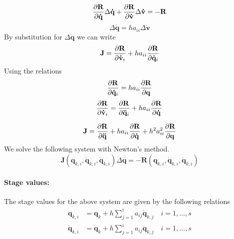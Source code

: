 \documentclass[pdftex,11pt,letter]{article}
\begin{document}
\begin{multicols}{2}
\begin{equation}
 \mathbf{\dfrac{\partial R}{\partial \dot{q}}} \Delta \mathbf{\dot{q}} +
 \mathbf{\dfrac{\partial R}{\partial \dot{v}}} \Delta \mathbf{\dot{v}} = -\mathbf{R}
\end{equation}
\begin{equation}
  \Delta \mathbf{\dot{q}} = h a_{ii} \Delta \mathbf{\dot{v}}
\end{equation}
By substitution for $\Delta \mathbf{\dot{q}} $ we can write
\begin{equation}
  \mathbf{J} = \dfrac{\partial \mathbf{R}}{\partial \mathbf{\dot{v}}_{i}} + h a_{ii}
  \dfrac{\partial \mathbf{R}}{\partial \mathbf{\dot{q}}_{i}}
\end{equation}
Using the relations
\begin{equation}
  \dfrac{\partial \mathbf{R}}{\partial \mathbf{\dot{q}}_{i}} = h a_{ii} \dfrac{\partial \mathbf{R}}{\partial \mathbf{{q}}}
\end{equation}
\begin{equation}
  \dfrac{\partial \mathbf{R}}{\partial \mathbf{\dot{v}}_{i}} =  \dfrac{\partial \mathbf{R}}{\partial \mathbf{\ddot{q}}_{i}} + h a_{ii} \dfrac{\partial \mathbf{R}}{\partial \mathbf{\dot{q}}} 
\end{equation}

\begin{equation}
  \mathbf{J} = \dfrac{\partial \mathbf{R}}{\partial \mathbf{\ddot{q}}} + h a_{ii}
  \dfrac{\partial \mathbf{R}}{\partial \mathbf{\dot{q}}} + h^2 a_{ii}^2
  \dfrac{\partial \mathbf{R}}{\partial \mathbf{{q}}}
\end{equation}
We solve the following system with Newton's method.
\begin{equation}
 \mathbf{J}
 \left(\mathbf{q}_{k,i},\mathbf{\dot{q}}_{k,i},\mathbf{\ddot{q}}_{k,i}\right)
 \Delta\mathbf{\ddot{q}} = -\mathbf{R}
 \left(\mathbf{q}_{k,i},\mathbf{\dot{q}}_{k,i},\mathbf{\ddot{q}}_{k,i}\right)
\end{equation}

\paragraph{Stage values:}
The stage values for the above system are given by the following relations
\begin{equation}
  \begin{split}
    \mathbf{q}_{k,i}  & = \mathbf{q}_{k} + h \sum_{j=1}^i a_{ij} \mathbf{\dot{q}}_{k,j} \quad i = 1,\ldots,s \\
    \mathbf{\dot{q}}_{k,i}  & = \mathbf{\dot{q}}_{k} + h \sum_{j=1}^i a_{ij} \mathbf{\ddot{q}}_{k,j} \quad i = 1,\ldots,s \\
  \end{split}
\end{equation}


\end{multicols}
\end{document}
